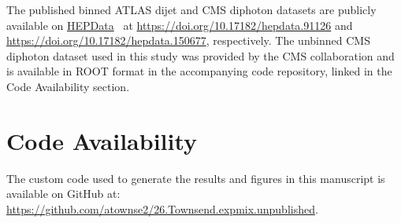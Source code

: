 \documentclass[a4paper,11pt]{article}
\begin{document}
The published binned ATLAS dijet and CMS diphoton datasets are publicly available on \href{https://www.hepdata.net/}{HEPData}~\cite{Maguire_2017} at \url{https://doi.org/10.17182/hepdata.91126} and \url{https://doi.org/10.17182/hepdata.150677}, respectively. The unbinned CMS diphoton dataset used in this study was provided by the CMS collaboration and is available in ROOT format in the accompanying code repository, linked in the Code Availability section.

\section*{Code Availability}
The custom code used to generate the results and figures in this manuscript is available on GitHub at: \url{https://github.com/atownse2/26.Townsend.expmix.unpublished}.





\end{document}
